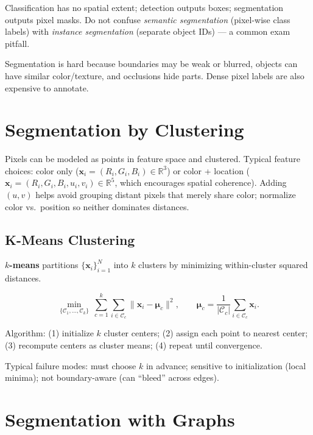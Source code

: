 \documentclass[11pt, oneside]{book}
\newcommand{\R}{\mathbb{R}}
\newcommand{\vct}[1]{\bm{#1}}           %
\begin{document}
\begin{thmbox}[title={Reprojection Error Minimization}]
\begin{defbox}[title={Correlation and Convolution}]
\begin{defbox}[title={ReLU and Pooling}]
\begin{defbox}[title={Segmentation}]
Classification has no spatial extent; detection outputs boxes; segmentation outputs pixel masks.
Do not confuse \emph{semantic segmentation} (pixel-wise class labels) with \emph{instance segmentation} (separate object IDs) --- a common exam pitfall.

Segmentation is hard because boundaries may be weak or blurred, objects can have similar color/texture,
and occlusions hide parts. Dense pixel labels are also expensive to annotate.

\section{Segmentation by Clustering}

Pixels can be modeled as points in feature space and clustered. Typical feature choices:
color only ($\vct{x}_i = (R_i,G_i,B_i)\in\R^3$) or color + location
($\vct{x}_i = (R_i,G_i,B_i,u_i,v_i)\in\R^5$, which encourages spatial coherence).
Adding $(u,v)$ helps avoid grouping distant pixels that merely share color; normalize color vs.\ position
so neither dominates distances.

\subsection{K-Means Clustering}

\begin{defbox}[title={K-Means}]
\textbf{$k$-means} partitions $\{\vct{x}_i\}_{i=1}^N$ into $k$ clusters by minimizing within-cluster squared distances.
\end{defbox}

\begin{thmbox}[title={K-Means Objective}]
\[
\min_{\{\mathcal{C}_1,\dots,\mathcal{C}_k\}} \ \sum_{c=1}^k \sum_{i\in\mathcal{C}_c} \|\vct{x}_i - \vct{\mu}_c\|^2,
\qquad
\vct{\mu}_c = \frac{1}{|\mathcal{C}_c|}\sum_{i\in\mathcal{C}_c}\vct{x}_i.
\]
\end{thmbox}

Algorithm: (1) initialize $k$ cluster centers; (2) assign each point to nearest center;
(3) recompute centers as cluster means; (4) repeat until convergence.

Typical failure modes: must choose $k$ in advance; sensitive to initialization (local minima); not boundary-aware
(can ``bleed'' across edges).

\section{Segmentation with Graphs}


\end{defbox}
\end{defbox}
\end{defbox}
\end{thmbox}
\end{document}

